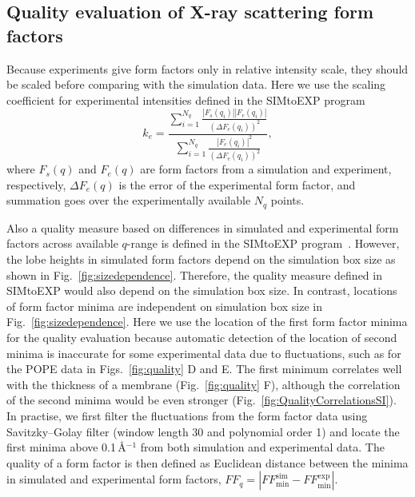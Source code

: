 \documentclass[fleqn,10pt]{wlscirep}
\begin{document}
\subsection{Quality evaluation of X-ray scattering form factors}
Because experiments give form factors only in relative intensity scale, they should be scaled before comparing with the simulation data. Here we use the scaling coefficient for experimental intensities defined in the SIMtoEXP program~\cite{kucerka10}
\begin{equation}
    k_e = \frac{\sum_{i=1}^{N_q} \frac{|F_s(q_i)||F_e(q_i)|}{(\Delta F_e(q_i))^2}}{\sum_{i=1}^{N_q} \frac{|F_e(q_i)|^2}{(\Delta F_e(q_i))^2}},
\end{equation}
where $F_s(q)$ and $F_e(q)$ are form factors from a simulation and experiment, respectively, $\Delta F_e(q)$ is the error of the experimental form factor, and summation goes over the experimentally available $N_q$ points. 

Also a quality measure based on differences in simulated and experimental form factors across available $q$-range is defined in the SIMtoEXP program~\cite{kucerka10}. However, the lobe heights in simulated form factors depend on the simulation box size as shown in Fig.~\ref{fig:sizedependence}. Therefore, the quality measure defined in SIMtoEXP  would also depend on the simulation box size. In contrast, locations of form factor minima are independent on simulation box size in Fig.~\ref{fig:sizedependence}. Here we use the location of the first form factor minima for the quality evaluation because automatic detection of the location of second minima is inaccurate for some experimental data due to fluctuations, such as for the POPE data in Figs.~\ref{fig:quality} D and E. 
The first minimum correlates well with the thickness of a membrane (Fig.~\ref{fig:quality} F), although the correlation of the second minima would be even stronger (Fig.~\ref{fig:QualityCorrelationsSI}). In practise, we first filter the fluctuations from the form factor data using Savitzky--Golay filter (window length 30 and polynomial order 1) and locate the first minima above 0.1\,\AA$^{-1}$ from both simulation and experimental data. The quality of a form factor is then defined as Euclidean distance between the minima in simulated and experimental form factors, $FF_q = |FF_\mathrm{min}^\mathrm{sim}-FF_\mathrm{min}^\mathrm{exp}|$. 
\end{document}
